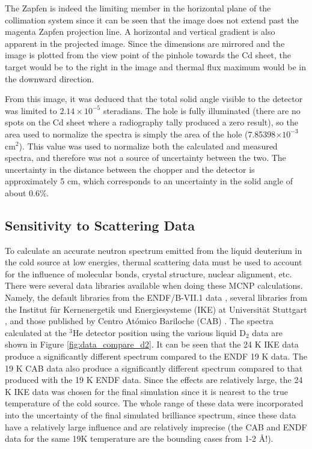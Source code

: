 \documentclass[5p,12pt]{elsarticle}
\begin{document}
The Zapfen is indeed the limiting member in the horizontal plane of the collimation system since it can be seen that the image does not extend past the magenta Zapfen projection line.  A horizontal and vertical gradient is also apparent in the projected image.  Since the dimensions are mirrored and the image is plotted from the view point of the pinhole towards the Cd sheet, the target would be to the right in the image and thermal flux maximum would be in the downward direction.

From this image, it was deduced that the total solid angle visible to the detector was limited to $2.14\times10^{-5}$ steradians.  The hole is fully illuminated (there are no spots on the Cd sheet where a radiography tally produced a zero result), so the area used to normalize the spectra is simply the area of the hole (7.85398$\times 10^{-3}$ cm$^2$).  This value was used to normalize both the calculated and measured spectra, and therefore was not a source of uncertainty between the two.  The uncertainty in the distance between the chopper and the detector is approximately 5 cm, which corresponds to an uncertainty in the solid angle of about 0.6\%.

%
%
%
%
%

\subsection{Sensitivity to Scattering Data}
\label{subsec:data}

To calculate an accurate neutron spectrum emitted from the liquid deuterium in the cold source at low energies, thermal scattering data must be used to account for the influence of molecular bonds, crystal structure, nuclear alignment, etc.   There were several data libraries available when doing these MCNP calculations.  Namely, the default libraries from the ENDF/B-VII.1 data \cite{mcnp6}, several libraries from the Institut f\"{u}r Kernenergetik und Energiesysteme (IKE) at Universit\"{a}t Stuttgart \cite{IKE}, and those published by Centro At\'{o}mico Bariloche (CAB) \cite{granada_d2}.  The spectra calculated at the $^3$He detector position using the various liquid D$_2$ data are shown in Figure \ref{fig:data_compare_d2}.  It can be seen that the 24 K IKE data produce a significantly different spectrum compared to the ENDF 19 K data.  The 19 K CAB data also produce a significantly different spectrum compared to that produced with the 19 K ENDF data.  Since the effects are relatively large, the 24 K IKE data was chosen for the final simulation since it is nearest to the true temperature of the cold source.  The whole range of these data were incorporated into the uncertainty of the final simulated brilliance spectrum, since these data have a relatively large influence and are relatively imprecise (the CAB and ENDF data for the same 19K temperature are the bounding cases from 1-2 {\AA}!).
\end{document}
